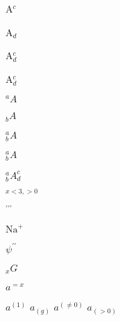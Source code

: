 \documentclass{article}
\begin{document}
A$^c$

A$_d$

A$^c_d$

A$_d^c$


$^aA$

$_bA$

$^a_bA$

$_b^aA$

$_b^aA^c_d$

$_{x<3,>0}$

$^{\prime\prime\prime}$

$\mathrm{Na}^+$ 

$\psi^{\prime\prime}$

$ _{\mathord{x}}\mathord{G} $

$ a^{= x}$

$ a ^{(1)} $
$ a _{(g)} $
$ a ^{(\neq 0)} $
$ a _{(>0)} $
\end{document}
